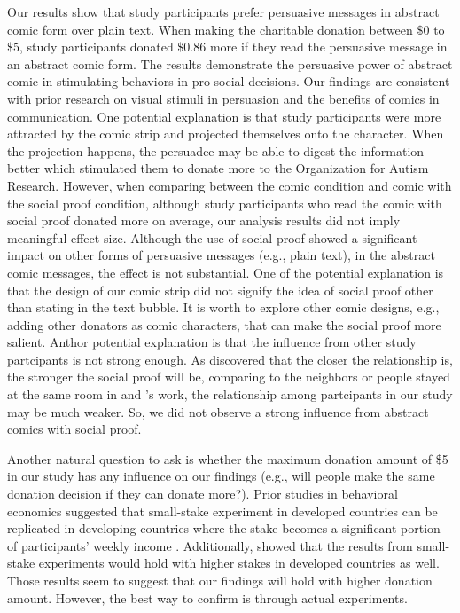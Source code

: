 Our results show that study participants prefer persuasive messages in abstract comic form over plain text. When making the charitable donation between $\$0$ to $\$5$, study participants donated $\$ 0.86$ more if they read the persuasive message in an abstract comic form. The results demonstrate the persuasive power of abstract comic in stimulating behaviors in pro-social decisions. Our findings are consistent with prior research on visual stimuli in persuasion and the benefits of comics in communication. One potential explanation is that study participants were more attracted by the comic strip and projected themselves onto the character. When the projection happens, the persuadee may be able to digest the information better which stimulated them to donate more to the Organization for Autism Research. However, when comparing between the comic condition and comic with the social proof condition, although study participants who read the comic with social proof donated more on average, our analysis results did not imply meaningful effect size. Although the use of social proof showed a significant impact on other forms of persuasive messages (e.g., plain text), in the abstract comic messages, the effect is not substantial. One of the potential explanation is that the design of our comic strip did not signify the idea of social proof other than stating in the text bubble. It is worth to explore other comic designs, e.g., adding other donators as comic characters, that can make the social proof more salient. Anthor potential explanation is that the influence from other study partcipants is not strong enough. As \textcite{goldstein2008room} discovered that the closer the relationship is, the stronger the social proof will be, comparing to the neighbors or people stayed at the same room in \textcite{Cialdini2004} and \textcite{goldstein2008room}'s work, the relationship among partcipants in our study may be much weaker. So, we did not observe a strong influence from abstract comics with social proof. 

Another natural question to ask is whether the maximum donation amount of  \$5  in our study has any influence on our findings (e.g., will people make the same donation decision if they can donate more?).  Prior studies in behavioral economics suggested that small-stake experiment in developed countries can be replicated in developing countries where the stake becomes a significant portion of participants' weekly income \cite{binswanger1980attitudes,binswanger1981attitudes,kachelmeier1992examining}. Additionally, \textcite{post2008deal} showed that the results from small-stake experiments would hold with higher stakes in developed countries as well. Those results seem to suggest that our findings will hold with higher donation amount. However, the best way to confirm is through actual experiments. 

